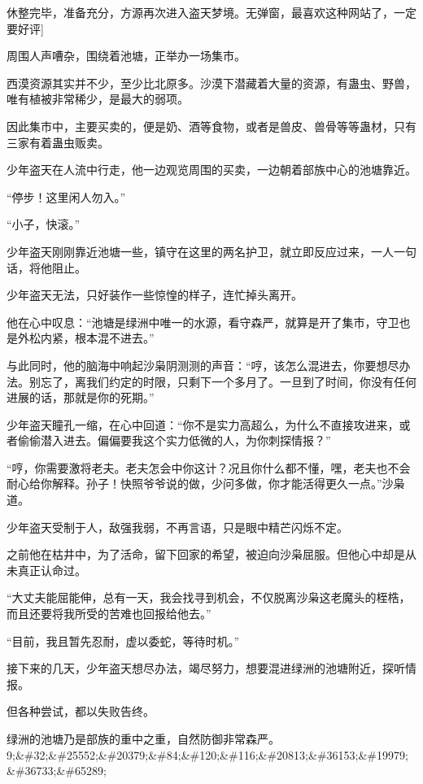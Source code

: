 
\begin{this_body}

休整完毕，准备充分，方源再次进入盗天梦境。无弹窗，最喜欢这种网站了，一定要好评]

周围人声嘈杂，围绕着池塘，正举办一场集市。

西漠资源其实并不少，至少比北原多。沙漠下潜藏着大量的资源，有蛊虫、野兽，唯有植被非常稀少，是最大的弱项。

因此集市中，主要买卖的，便是奶、酒等食物，或者是兽皮、兽骨等等蛊材，只有三家有着蛊虫贩卖。

少年盗天在人流中行走，他一边观览周围的买卖，一边朝着部族中心的池塘靠近。

“停步！这里闲人勿入。”

“小子，快滚。”

少年盗天刚刚靠近池塘一些，镇守在这里的两名护卫，就立即反应过来，一人一句话，将他阻止。

少年盗天无法，只好装作一些惊惶的样子，连忙掉头离开。

他在心中叹息：“池塘是绿洲中唯一的水源，看守森严，就算是开了集市，守卫也是外松内紧，根本混不进去。”

与此同时，他的脑海中响起沙枭阴测测的声音：“哼，该怎么混进去，你要想尽办法。别忘了，离我们约定的时限，只剩下一个多月了。一旦到了时间，你没有任何进展的话，那就是你的死期。”

少年盗天瞳孔一缩，在心中回道：“你不是实力高超么，为什么不直接攻进来，或者偷偷潜入进去。偏偏要我这个实力低微的人，为你刺探情报？”

“哼，你需要激将老夫。老夫怎会中你这计？况且你什么都不懂，嘿，老夫也不会耐心给你解释。孙子！快照爷爷说的做，少问多做，你才能活得更久一点。”沙枭道。

少年盗天受制于人，敌强我弱，不再言语，只是眼中精芒闪烁不定。

之前他在枯井中，为了活命，留下回家的希望，被迫向沙枭屈服。但他心中却是从未真正认命过。

“大丈夫能屈能伸，总有一天，我会找寻到机会，不仅脱离沙枭这老魔头的桎梏，而且还要将我所受的苦难也回报给他去。”

“目前，我且暂先忍耐，虚以委蛇，等待时机。”

接下来的几天，少年盗天想尽办法，竭尽努力，想要混进绿洲的池塘附近，探听情报。

但各种尝试，都以失败告终。

绿洲的池塘乃是部族的重中之重，自然防御非常森严。9;\&\#32;\&\#25552;\&\#20379;\&\#84;\&\#120;\&\#116;\&\#20813;\&\#36153;\&\#19979;\&\#36733;\&\#65289;


\end{this_body}
